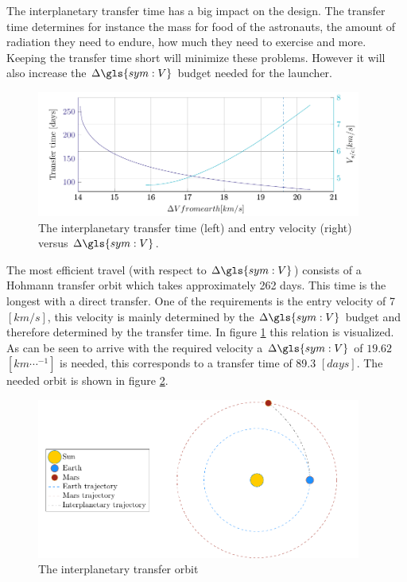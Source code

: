 The interplanetary transfer time has a big impact on the design. The transfer time determines for instance the mass for food of the astronauts, the amount of radiation they need to endure, how much they need to exercise and more. Keeping the transfer time short will minimize these problems. However it will also increase the $\Delta \gls{sym:V}$ budget needed for the launcher. 

\begin{figure}[h!]
	\centering
	\includegraphics[width=0.95\textwidth]{Figure/Inter_transfer/transfer_time.pdf}
	\caption{The interplanetary transfer time (left) and entry velocity (right) versus $\Delta \gls{sym:V}$.}
	\label{fig:inter_time}
\end{figure}

The most efficient travel (with respect to $\Delta \gls{sym:V}$) consists of a Hohmann transfer orbit which takes approximately 262 days. This time is the longest with a direct transfer. One of the requirements is the entry velocity of 7 $\left[km /s\right]$, this velocity is mainly determined by the $\Delta \gls{sym:V}$ budget and therefore determined by the transfer time. In figure \ref{fig:inter_time} this relation is visualized. As can be seen to arrive with the required velocity a $\Delta \gls{sym:V}$ of $19.62$ $\left[km \cdots^{-1}\right]$ is needed, this corresponds to a transfer time of 89.3 $\left[days\right]$. The needed orbit is shown in figure \ref{fig:inter_orbit}.

\begin{figure}[h!]
	\centering
	\includegraphics[width=0.95\textwidth]{Figure/Inter_transfer/orbits.pdf}
	\caption{The interplanetary transfer orbit}
	\label{fig:inter_orbit}
\end{figure}

